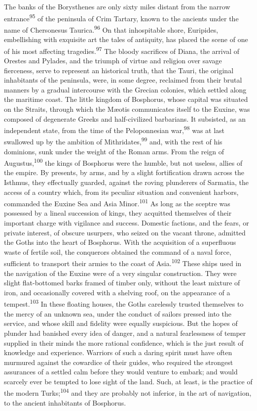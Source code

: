 The banks of the Borysthenes are only sixty miles distant from
the narrow entrance\textsuperscript{95} of the peninsula of Crim Tartary, known to
the ancients under the name of Chersonesus Taurica.\textsuperscript{96} On that
inhospitable shore, Euripides, embellishing with exquisite art
the tales of antiquity, has placed the scene of one of his most
affecting tragedies.\textsuperscript{97} The bloody sacrifices of Diana, the
arrival of Orestes and Pylades, and the triumph of virtue and
religion over savage fierceness, serve to represent an historical
truth, that the Tauri, the original inhabitants of the peninsula,
were, in some degree, reclaimed from their brutal manners by a
gradual intercourse with the Grecian colonies, which settled
along the maritime coast. The little kingdom of Bosphorus, whose
capital was situated on the Straits, through which the Mæotis
communicates itself to the Euxine, was composed of degenerate
Greeks and half-civilized barbarians. It subsisted, as an
independent state, from the time of the Peloponnesian war,\textsuperscript{98} was
at last swallowed up by the ambition of Mithridates,\textsuperscript{99} and, with
the rest of his dominions, sunk under the weight of the Roman
arms. From the reign of Augustus,\textsuperscript{100} the kings of Bosphorus were
the humble, but not useless, allies of the empire. By presents,
by arms, and by a slight fortification drawn across the Isthmus,
they effectually guarded, against the roving plunderers of
Sarmatia, the access of a country which, from its peculiar
situation and convenient harbors, commanded the Euxine Sea and
Asia Minor.\textsuperscript{101} As long as the sceptre was possessed by a lineal
succession of kings, they acquitted themselves of their important
charge with vigilance and success. Domestic factions, and the
fears, or private interest, of obscure usurpers, who seized on
the vacant throne, admitted the Goths into the heart of
Bosphorus. With the acquisition of a superfluous waste of fertile
soil, the conquerors obtained the command of a naval force,
sufficient to transport their armies to the coast of Asia.\textsuperscript{102}
These ships used in the navigation of the Euxine were of a very
singular construction. They were slight flat-bottomed barks
framed of timber only, without the least mixture of iron, and
occasionally covered with a shelving roof, on the appearance of a
tempest.\textsuperscript{103} In these floating houses, the Goths carelessly
trusted themselves to the mercy of an unknown sea, under the
conduct of sailors pressed into the service, and whose skill and
fidelity were equally suspicious. But the hopes of plunder had
banished every idea of danger, and a natural fearlessness of
temper supplied in their minds the more rational confidence,
which is the just result of knowledge and experience. Warriors of
such a daring spirit must have often murmured against the
cowardice of their guides, who required the strongest assurances
of a settled calm before they would venture to embark; and would
scarcely ever be tempted to lose sight of the land. Such, at
least, is the practice of the modern Turks;\textsuperscript{104} and they are
probably not inferior, in the art of navigation, to the ancient
inhabitants of Bosphorus.

